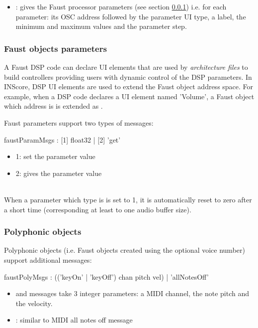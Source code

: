 \documentclass[a4paper,twoside]{article}
\newcommand{\subsublevel}[1]	{\subsubsection{#1}}
\begin{document}
\begin{itemize}
\item {}: gives the Faust processor parameters (see section \ref{webFaustParams}) i.e. for each parameter: its OSC address followed by the parameter UI type, a label, the minimum and maximum values and the parameter step.
\end{itemize}


\subsublevel{Faust objects parameters}
\label{webFaustParams}

A Faust DSP code can declare UI elements that are used by \emph{architecture files} to build controllers providing users with dynamic control of the DSP parameters. In INScore, DSP UI elements are used to extend the Faust object address space. For example, when a DSP code declares a UI element named 'Volume', a Faust object which address is  is extended as .

Faust parameters support two types of messages:

\begin{rail}
faustParamMsgs : [1] float32 | [2] 'get'
\end{rail}

\begin{itemize}
\item 1: set the parameter value
\item 2: gives the parameter value
\end{itemize}

\note{}\\
When a parameter which type is  is set to 1, it is automatically reset to zero after a short time (corresponding at least to one audio buffer size).

\subsublevel{Polyphonic objects}
\label{webFaustPoly}

Polyphonic objects (i.e. Faust objects created using the optional voice number) support additional messages:

\begin{rail}
faustPolyMsgs : (('keyOn' | 'keyOff') chan pitch vel)
				| 'allNotesOff'
\end{rail}

\begin{itemize}
\item {} and  messages take 3 integer parameters: a MIDI channel, the note pitch and the velocity.
\item {}: similar to MIDI all notes off message
\end{itemize}
\end{document}
